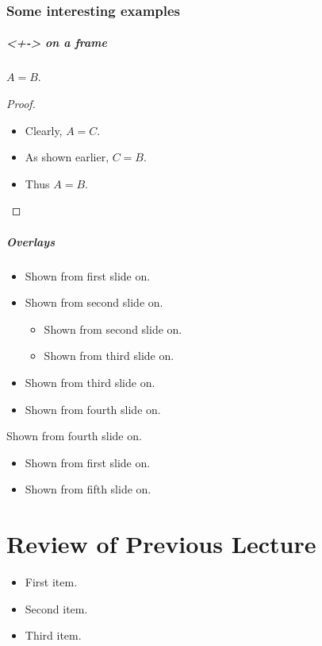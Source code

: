 \documentclass{beamer}
\begin{document}
\section{Some interesting examples}
\begin{frame}[<+->]
    \frametitle{<+-> on a frame}
    \begin{theorem}
    $A = B$.
    \end{theorem}
    \begin{proof}
    \begin{itemize}
    \item Clearly, $A = C$.
    \item As shown earlier, $C = B$.
    \item<3-> Thus $A = B$.
    \end{itemize}
    \end{proof}
\end{frame}

\begin{frame}
\frametitle{Overlays}
\begin{itemize}
\item
Shown from first slide on.
\pause
\item
Shown from second slide on.
\begin{itemize}
\item
Shown from second slide on.
\pause
\item
Shown from third slide on.
\end{itemize}
\item
Shown from third slide on.
\pause
\item
Shown from fourth slide on.
\end{itemize}
Shown from fourth slide on.
\begin{itemize}
\onslide
\item
Shown from first slide on.
\pause
\item
Shown from fifth slide on.
\end{itemize}
\end{frame}

\part{Review of Previous Lecture}
\frame{\partpage}

\begin{frame}
    \begin{itemize}
        \item<1-> First item.
        \item<2-> Second item.
        \item<3-> Third item. 
    \end{itemize}
    \hyperlink{jumptosecond}{}
    \hypertarget<2>{jumptosecond}{}
\end{frame}
\end{document}
